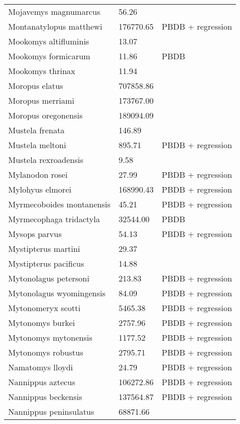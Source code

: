 \begin{center}
\begin{longtable}{p{} p{} p{} }
  Mojavemys magnumarcus & 56.26 & \cite{Tomiya2013} \\ 
  Montanatylopus matthewi & 176770.65 & PBDB + regression \\ 
  Mookomys altifluminis & 13.07 & \cite{Tomiya2013} \\ 
  Mookomys formicarum & 11.86 & PBDB \\ 
  Mookomys thrinax & 11.94 & \cite{Tomiya2013} \\ 
  Moropus elatus & 707858.86 & \cite{Tomiya2013} \\ 
  Moropus merriami & 173767.00 & \cite{McKenna2011} \\ 
  Moropus oregonensis & 189094.09 & \cite{Tomiya2013} \\ 
  Mustela frenata & 146.89 & \cite{Smith2004} \\ 
  Mustela meltoni & 895.71 & PBDB + regression \\ 
  Mustela rexroadensis & 9.58 & \cite{Tomiya2013} \\ 
  Mylanodon rosei & 27.99 & PBDB + regression \\ 
  Mylohyus elmorei & 168990.43 & PBDB + regression \\ 
  Myrmecoboides montanensis & 45.21 & PBDB + regression \\ 
  Myrmecophaga tridactyla & 32544.00 & PBDB \\ 
  Mysops parvus & 54.13 & PBDB + regression \\ 
  Mystipterus martini & 29.37 & \cite{Tomiya2013} \\ 
  Mystipterus pacificus & 14.88 & \cite{Tomiya2013} \\ 
  Mytonolagus petersoni & 213.83 & PBDB + regression \\ 
  Mytonolagus wyomingensis & 84.09 & PBDB + regression \\ 
  Mytonomeryx scotti & 5465.38 & PBDB + regression \\ 
  Mytonomys burkei & 2757.96 & PBDB + regression \\ 
  Mytonomys mytonensis & 1177.52 & PBDB + regression \\ 
  Mytonomys robustus & 2795.71 & PBDB + regression \\ 
  Namatomys lloydi & 24.79 & PBDB + regression \\ 
  Nannippus aztecus & 106272.86 & PBDB + regression \\ 
  Nannippus beckensis & 137564.87 & PBDB + regression \\ 
  Nannippus peninsulatus & 68871.66 & \cite{Tomiya2013} \\ 

\end{longtable}
\end{center}
